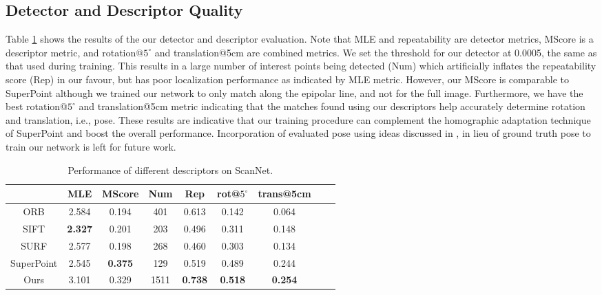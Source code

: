 \documentclass[runningheads]{llncs}
\begin{document}
\subsection{Detector and Descriptor Quality}
Table \ref{table1} shows the results of the our detector and descriptor evaluation. Note that MLE and repeatability are detector metrics, MScore is a descriptor metric, and rotation@$5^{\circ}$  and translation@5cm are combined metrics. We set the threshold for our detector at 0.0005, the same as that used during training. This results in a large number of interest points being detected (Num) which artificially inflates the repeatability score (Rep) in our favour, but has poor localization performance as indicated by MLE metric. However, our MScore is comparable to SuperPoint although we trained our network to only match along the epipolar line, and not for the full image. Furthermore, we have the best rotation@$5^{\circ}$ and translation@5cm metric indicating that the matches found using our descriptors help accurately determine rotation and translation, i.e., pose. These results are indicative that our training procedure can complement the homographic adaptation technique of SuperPoint and boost the overall performance. Incorporation of evaluated pose using ideas discussed in \cite{sarlin2019superglue}, in lieu of ground truth pose to train our network is left for future work.   
\begin{table}
  \caption{Performance of different descriptors on ScanNet.}
  \centering
\begin{tabular}{ccccccccc}
  \hline
&\textbf{MLE}  &\textbf{MScore} & \textbf{Num} & \textbf{Rep}& \textbf{rot@$5^{\circ}$}& \textbf{trans@5cm}\\

    \hline
ORB  &	2.584 &		0.194  &   401  & 0.613 &  0.142 &		0.064	 \\
SIFT &	\textbf{2.327} &		0.201  &   203  & 0.496 &  0.311 &		0.148	\\
SURF &	2.577 &		0.198  &   268  & 0.460 &  0.303 &		0.134	\\
SuperPoint  &  2.545 &     \textbf{0.375}  &   129  & 0.519	&  0.489 &      0.244 \\
Ours &	 3.101 &   0.329   &  1511  & \textbf{0.738} &  \textbf{0.518} &\textbf{0.254} 	\\
\hline
  \end{tabular}
  \label{table1}
\end{table}
\end{document}
